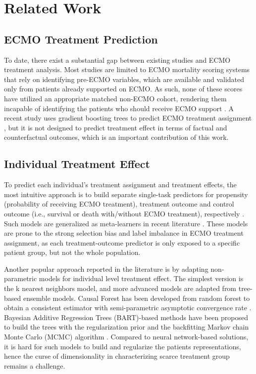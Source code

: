 \section{Related Work}

\subsection{ECMO Treatment Prediction} 
To date, there exist a substantial gap between existing studies and ECMO treatment analysis. Most studies are limited to ECMO mortality scoring systems \cite{pappalardo2013predicting, schmidt2014predicting, schmidt2013preserve, shah2023validation} that rely on identifying pre-ECMO variables, which are available and validated only from patients already supported on ECMO. As such, none of these scores have utilized an appropriate matched non-ECMO cohort, rendering them incapable of identifying the  patients who should receive ECMO support \cite{shah2021extracorporeal,short2022extracorporeal}. A recent study uses gradient boosting trees to predict ECMO treatment assignment \cite{xue2022ecmo}, but it is not designed to predict treatment effect in terms of factual and counterfactual outcomes, which is an important contribution of this work. 

\subsection{Individual Treatment Effect} 
To predict each individual's treatment assignment and treatment effects, the most intuitive approach is to build separate single-task predictors for propensity (probability of receiving ECMO treatment), treatment outcome and control outcome (i.e., survival or death with/without ECMO treatment), respectively  \cite{alaa2017dcnpd,johansson2016bnn,shalit2017cfrnet,chipman2010bart}. Such models are generalized as meta-learners in recent literature \cite{curth2021meta, curth2021st}. These models are prone to the strong selection bias and label imbalance in ECMO treatment assignment, as each treatment-outcome predictor is only exposed to a specific patient group, but not the whole population.

 Another popular approach reported in the literature is by adapting non-parametric models for individual level treatment effect. The simplest version is the k nearest neighbors model, and more advanced models are adapted from tree-based ensemble models. Causal Forest has been developed from random forest to obtain a consistent estimator with semi-parametric asymptotic convergence rate \cite{wager2018cf}. Bayesian Additive Regression Trees (BART)-based methods have been proposed to build the trees with the regularization prior and the backfitting Markov chain Monte Carlo (MCMC) algorithm \cite{chipman2010bart, hahn2020bayesian}. Compared to neural network-based solutions, it is hard for such models to build and regularize the patients representations, hence the curse of dimensionality in characterizing scarce treatment group remains a challenge. 
 
